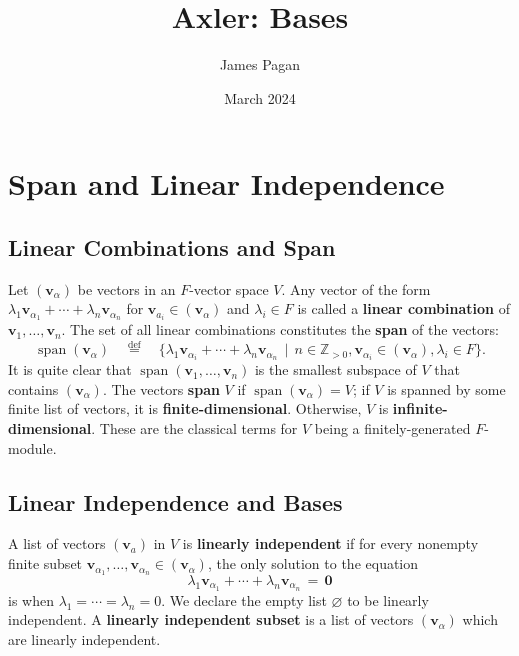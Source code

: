 \documentclass[11pt]{article}
\title{Axler: Bases}
\author{James Pagan}
\date{March 2024}
\renewcommand{\vec}[1]{\mathbf{#1}}
\newcommand{\spn}{\operatorname{span}}
\begin{document}
\maketitle
\tableofcontents
\newpage


\section{Span and Linear Independence}


\subsection{Linear Combinations and Span}

Let $(\vec{v}_{\alpha})$ be vectors in an $F$-vector space $V$. Any vector of the form $\lambda_{1} \vec{v}_{\alpha_{1}} + \cdots + \lambda_{n} \vec{v}_{\alpha_{n}}$ for $\vec{v}_{a_{i}} \in (\vec{v}_{\alpha})$ and $\lambda_{i} \in F$ is called a \textbf{linear combination} of $\vec{v}_{1}, \ldots, \vec{v}_{n}$. The set of all linear combinations constitutes the \textbf{span} of the vectors:
\[
  \spn(\vec{v}_{\alpha}) \quad \stackrel{\text{def}}{=} \quad \{ \lambda_{1} \vec{v}_{\alpha_{i}} + \cdots + \lambda_{n} \vec{v}_{\alpha_{n}} \, \mid \, n \in \mathbb{Z}_{> 0}, \vec{v}_{\alpha_{i}} \in (\vec{v}_{\alpha}), \lambda_{i} \in F \}.
\]
It is quite clear that $\spn(\vec{v}_{1}, \ldots, \vec{v}_{n})$ is the smallest subspace of $V$ that contains $(\vec{v}_{\alpha})$. The vectors \textbf{span} $V$ if $\spn(\vec{v}_{\alpha}) = V$; if $V$ is spanned by some finite list of vectors, it is \textbf{finite-dimensional}. Otherwise, $V$ is \textbf{infinite-dimensional}. These are the classical terms for $V$ being a finitely-generated $F$-module.


\subsection{Linear Independence and Bases}

A list of vectors $(\vec{v}_{a})$ in $V$ is \textbf{linearly independent} if for every nonempty finite subset $\vec{v}_{\alpha_{1}}, \ldots, \vec{v}_{\alpha_{n}} \in (\vec{v}_{\alpha})$, the only solution to the equation
\[
  \lambda_{1} \vec{v}_{\alpha_{1}} + \cdots + \lambda_{n} \vec{v}_{\alpha_{n}} \, = \, \vec{0}
\]
is when $\lambda_{1} = \cdots = \lambda_{n} = 0$. We declare the empty list $\varnothing$ to be linearly independent. A \textbf{linearly independent subset} is a list of vectors $(\vec{v}_{\alpha})$ which are linearly independent.
\end{document}
